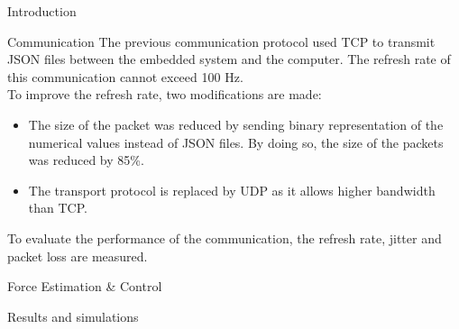 \documentclass[a0paper,landscape]{baposter}
\begin{document}
\begin{poster}
\begin{posterbox}[name=intro,column=0]{Introduction}

%
\end{posterbox}

%  

\begin{posterbox}[name=communication,below=intro,above=bottom]{Communication}
	\vspace{5mm}
The previous communication protocol used TCP to transmit JSON files between the embedded system and the computer. The refresh rate of this communication cannot exceed 100 Hz.\\
To improve the refresh rate, two modifications are made:
\vspace{5mm}
\begin{itemize}
\item The size of the packet was reduced by sending binary representation of the numerical values instead of JSON files. By doing so, the size of the packets was reduced by 85\%.
\item The transport protocol is replaced by UDP as it allows higher bandwidth than TCP.
\end{itemize}
\vspace{5mm}
To evaluate the performance of the communication, the refresh rate, jitter and packet loss are measured.


	
\end{posterbox}



\begin{posterbox}[name=Control,column=1,span=2]{Force Estimation \& Control}



     



\end{posterbox}

\begin{posterbox}[name=results_and_simulations,column=1,span=2,below=Control,above=bottom]{Results and simulations}
 
\end{posterbox}


\end{poster}
\end{document}
